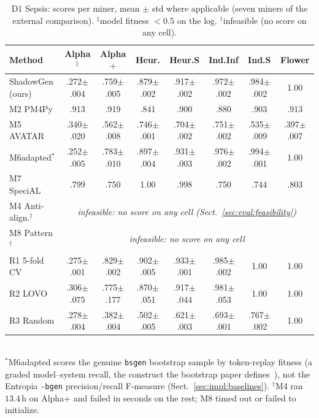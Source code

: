 \documentclass[runningheads]{llncs}
\newcommand{\chg}[1]{\textcolor{chgblue}{#1}}
\begin{document}
\begin{table}[t]
\centering
\caption{D1 Sepsis: scores per miner, mean $\pm$ std where applicable (seven miners of the external comparison). $^{\ddagger}$model fitness $<0.5$ on the log. $^{\dagger}$infeasible (no score on any cell).}
\label{tab:external}
\setlength{\tabcolsep}{1.6pt}
\scriptsize
\begin{tabular}{@{}lccccccc@{}}
\toprule
Method & Alpha$^{\ddagger}$ & Alpha$+$ & Heur. & Heur.S & Ind.Inf & Ind.S & Flower \\
\midrule
\chg{ShadowGen (ours)} & .272$\pm$.004 & .759$\pm$.005 & .879$\pm$.002 & .917$\pm$.002 & .972$\pm$.002 & .984$\pm$.002 & 1.00 \\
M2 PM4Py & .913 & .919 & .841 & .900 & .880 & .903 & .913 \\
M5 AVATAR & .340$\pm$.020 & .562$\pm$.008 & .746$\pm$.001 & .704$\pm$.002 & .751$\pm$.002 & .535$\pm$.009 & .397$\pm$.007 \\
M6adapted$^{*}$ & .252$\pm$.005 & .783$\pm$.010 & .897$\pm$.004 & .931$\pm$.003 & .976$\pm$.002 & .994$\pm$.001 & 1.00 \\
M7 SpeciAL & .799 & .750 & 1.00 & .998 & .750 & .744 & .803 \\
M4 Anti-align.$^{\dagger}$ & \multicolumn{7}{c}{\emph{infeasible: no score on any cell (Sect.~\ref{sec:eval:feasibility})}} \\
M8 Pattern$^{\dagger}$ & \multicolumn{7}{c}{\emph{infeasible: no score on any cell}} \\
\midrule
R1 5-fold CV & .275$\pm$.001 & .829$\pm$.002 & .902$\pm$.005 & .933$\pm$.001 & .985$\pm$.002 & 1.00 & 1.00 \\
R2 LOVO & .306$\pm$.075 & .775$\pm$.177 & .870$\pm$.051 & .917$\pm$.044 & .981$\pm$.053 & 1.00 & 1.00 \\
R3 Random & .278$\pm$.004 & .382$\pm$.004 & .502$\pm$.005 & .621$\pm$.003 & .693$\pm$.001 & .767$\pm$.002 & 1.00 \\
\bottomrule
\end{tabular}\\[2pt]
{\scriptsize $^{*}$M6adapted scores the genuine \texttt{bsgen} bootstrap sample by token-replay fitness (a graded model--system recall, the construct the bootstrap paper defines~\cite{polyvyanyy2022bootstrap}), not the Entropia \texttt{-bgen} precision/recall F-measure (Sect.~\ref{sec:impl:baselines}). $^{\dagger}$M4 ran $13.4$\,h on Alpha+ and failed in seconds on the rest; M8 timed out or failed to initialize.}
\end{table}
\end{document}
